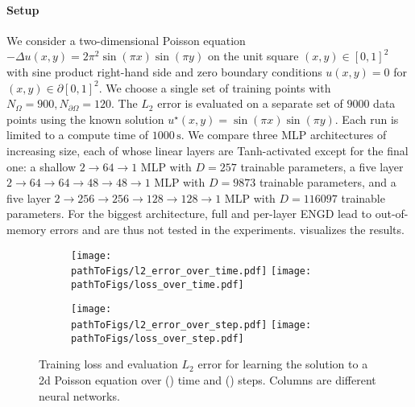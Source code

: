 \paragraph{Setup} We consider a two-dimensional Poisson equation $-\Delta u(x, y) = 2 \pi^2 \sin(\pi x) \sin(\pi y)$ on the unit square $(x,y) \in [0, 1]^2$ with sine product right-hand side and zero boundary conditions $u(x, y) = 0$ for $(x,y) \in \partial [0,1]^2$.
We choose a single set of training points with $N_{\Omega} = 900, N_{\partial\Omega} = 120$.
The $L_2$ error is evaluated on a separate set of $\num{9000}$ data points using the known solution $u^{\star}(x, y) = \sin(\pi x) \sin(\pi y)$.
Each run is limited to a compute time of $\num{1000}\,\text{s}$.
We compare three MLP architectures of increasing size, each of whose linear layers are Tanh-activated except for the final one: a shallow $2\to 64\to 1$ MLP with $D=257$ trainable parameters, a five layer $2 \to 64 \to 64 \to 48 \to 48 \to 1$ MLP with $D=\num{9873}$ trainable parameters, and a five layer $2 \to 256 \to 256\to 128 \to 128 \to 1$ MLP with $D=\num{116097}$ trainable parameters.
For the biggest architecture, full and per-layer ENGD lead to out-of-memory errors and are thus not tested in the experiments.
 visualizes the results.

\begin{figure}[!h]
  \centering
  \def\pathToFigs{../kfac_pinns_exp/exp17_groupplot_poisson2d}
  \begin{subfigure}[t]{1.0\linewidth}
    \caption{}\label{subfig:poisson2d-time}
    \texttt{[image: \\pathToFigs/l2\_error\_over\_time.pdf]}
    \texttt{[image: \\pathToFigs/loss\_over\_time.pdf]}
  \end{subfigure}
  \begin{subfigure}[t]{1.0\linewidth}
    \caption{}\label{subfig:poisson2d-step}
    \texttt{[image: \\pathToFigs/l2\_error\_over\_step.pdf]}
    \texttt{[image: \\pathToFigs/loss\_over\_step.pdf]}
  \end{subfigure}
  \caption{ Training loss and evaluation $L_2$ error for learning the solution to a 2d Poisson equation over () time and () steps.
    Columns are different neural networks.}\label{fig:poisson2d-appendix}
\end{figure}

